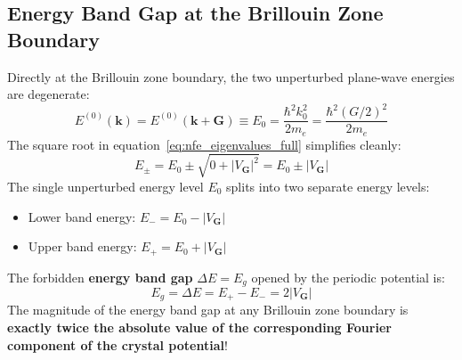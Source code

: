 \documentclass[11pt,a4paper]{article}
\newcommand{\vb}[1]{\mathbf{#1}}
\begin{document}
\subsection{Energy Band Gap at the Brillouin Zone Boundary}
Directly at the Brillouin zone boundary, the two unperturbed plane-wave energies are degenerate:
\begin{equation}
E^{(0)}(\vb{k}) = E^{(0)}(\vb{k}+\vb{G}) \equiv E_0 = \frac{\hbar^2 k_0^2}{2m_e} = \frac{\hbar^2 (G/2)^2}{2m_e}
\end{equation}
The square root in equation~\eqref{eq:nfe_eigenvalues_full} simplifies cleanly:
\begin{equation}
E_\pm = E_0 \pm \sqrt{0 + |V_{\vb{G}}|^2} = E_0 \pm |V_{\vb{G}}|
\end{equation}
The single unperturbed energy level $E_0$ splits into two separate energy levels:
\begin{itemize}
    \item Lower band energy: $E_- = E_0 - |V_{\vb{G}}|$
    \item Upper band energy: $E_+ = E_0 + |V_{\vb{G}}|$
\end{itemize}
The forbidden \textbf{energy band gap} $\Delta E = E_g$ opened by the periodic potential is:
\begin{equation}
\boxed{E_g = \Delta E = E_+ - E_- = 2|V_{\vb{G}}|}
\label{eq:band_gap_formula}
\end{equation}
The magnitude of the energy band gap at any Brillouin zone boundary is \textbf{exactly twice the absolute value of the corresponding Fourier component of the crystal potential}!
\end{document}
